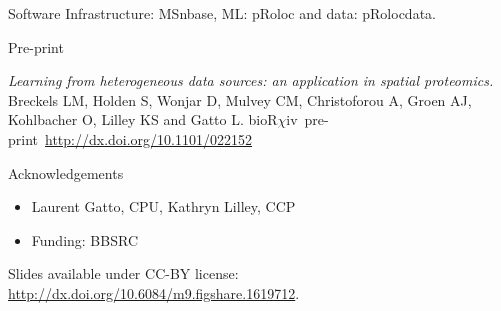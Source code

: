 \documentclass[bigger]{beamer}
\newcommand{\Rpackage}[1]{{\mbox{\normalfont\textsf{#1}}}}
\begin{document}
  \begin{frame}

   \begin{block}{Software}
     \vspace{.1cm}
    Infrastructure: \Rpackage{MSnbase}, ML: \Rpackage{pRoloc} and data: \Rpackage{pRolocdata}.
    \vspace{.2cm}
  \end{block}
   
  \begin{block}{Pre-print}
  \begin{small}
    \textit{Learning from heterogeneous data sources: an application
      in spatial proteomics.} Breckels LM, Holden S, Wonjar D, Mulvey
    CM, Christoforou A, Groen AJ, Kohlbacher O, Lilley KS and Gatto L.
    bioR$\chi$iv~pre-print~\url{http://dx.doi.org/10.1101/022152}
    \vspace{.2cm}
    \end{small}
  \end{block}
  
  \begin{block}{Acknowledgements}
    \begin{itemize}
    \item Laurent Gatto, CPU, Kathryn Lilley, CCP
    \item Funding: BBSRC
    \end{itemize}
  \end{block}
  
  \footnotesize{Slides available under CC-BY license:
    \url{http://dx.doi.org/10.6084/m9.figshare.1619712}.}
  
  \end{frame}
\end{document}
